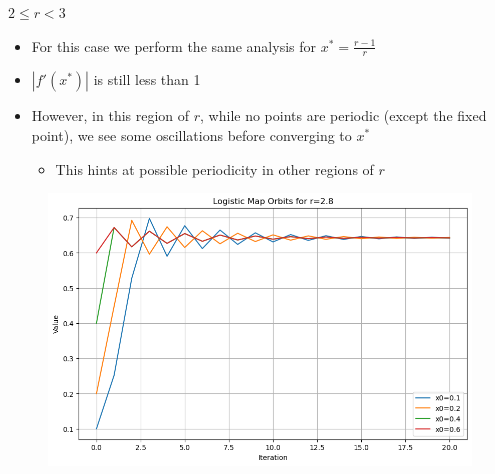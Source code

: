 \documentclass[
	11pt, %
]{beamer}
\begin{document}
\begin{frame}{$2\leq r<3$}
\begin{itemize}
    \item For this case we perform the same analysis for $x^\ast=\frac{r-1}{r}$
    \item $|f'(x^\ast)|$ is still less than 1
    \item However, in this region of $r$, while no points are periodic (except the fixed point), we see some oscillations before converging to $x^\ast$
    \begin{itemize}
        \item This hints at possible periodicity in other regions of $r$
    \end{itemize}
\end{itemize}
     	\begin{figure}
	\includegraphics[scale=0.3]{./figures/2lesrles3}
	\end{figure}
\end{frame}
\end{document}
